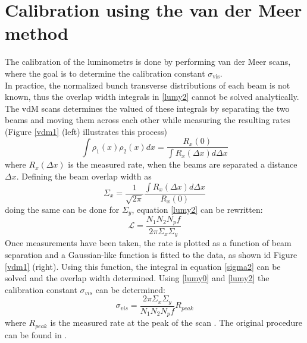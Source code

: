 \section{Calibration using the van der Meer method }
The calibration of the luminometrs is done by performing van der Meer scans, where the goal is to determine the calibration constant $\sigma_{\text {vis}}$.\\
In practice, the normalized bunch transverse distributions of each beam is not known, thus the overlap width integrals in \ref{lumy2} cannot be solved analytically. The vdM scans determines the valued of these integrals by separating the two beams and moving them across each other while measuring the resulting rates (Figure \ref{vdm1} (left) illustrates this process)
\begin{equation}
    \int \rho_1(x)\rho_{2}(x)dx=\frac{R_{x}(0)}{\int R_{x}(\Delta x)d\Delta x}
\end{equation}
where $R_{x}(\Delta x)$ is the measured rate, when the beams are separated a distance $\Delta x$. Defining the beam overlap  width as
\begin{equation}
\Sigma_{x}=\frac{1}{\sqrt{2\pi}}\frac{\int R_{x}(\Delta x) d\Delta x}{R_{x}(0)}
\label{sigma2}
\end{equation}
doing the same can be done for $\Sigma_{y}$, equation \ref{lumy2} can be rewritten: 
\begin{equation}
    \mathcal{L}=\frac{N_1N_2N_p f}{2\pi\Sigma_x\Sigma_y}
\end{equation}
Once measurements have been taken, the rate is plotted as a function of beam separation and a Gaussian-like function is fitted to the data, as shown id Figure \ref{vdm1} (right). Using this function, the integral in equation \ref{sigma2} can be solved and the overlap width determined. Using \ref{lumy0} and \ref{lumy2} the calibration constant $\sigma_{vis}$ can be determined:
\begin{equation}
    \sigma_{vis}=\frac{2\pi \Sigma_x\Sigma_y}{N_1N_2N_p f} R_{peak}
    \label{sigmavis}
\end{equation}
where $R_{peak}$ is the measured rate at the peak of the scan \cite{CMS-PAS-LUM-18-002}\cite{CMS-PAS-LUM-12-001}. The original procedure can be found in \cite{vanderMeer:296752}.
\newcommand\gauss[2]{1/(#2*sqrt(2*pi))*exp(-((x-#1)^2)/(2*#2^2))} %

